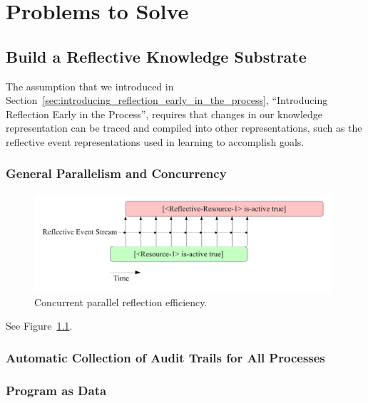 \chapter{Problems to Solve}\label{ch:problems_to_solve}

\section{Build a Reflective Knowledge Substrate}

The assumption that we introduced in
Section~\ref{sec:introducing_reflection_early_in_the_process},
``Introducing Reflection Early in the Process'', requires that changes
in our knowledge representation can be traced and compiled into other
representations, such as the reflective event representations used in
learning to accomplish goals.

\subsection{General Parallelism and Concurrency}

\begin{figure}[bth]
  \center
  \includegraphics[width=11cm]{gfx/concurrent_parallel_reflection_efficiency}
  \caption[Concurrent parallel reflection efficiency]{Concurrent parallel reflection efficiency.}
  \label{fig:concurrent_parallel_reflection_efficiency}
\end{figure}

See Figure~\ref{fig:concurrent_parallel_reflection_efficiency}.



\subsection{Automatic Collection of Audit Trails for All Processes}

\subsection{Program as Data}

